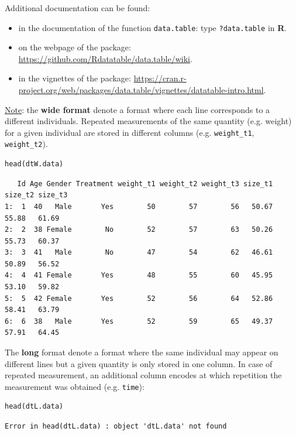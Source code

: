 \documentclass{article}
\newcommand\Rlogo{\textbf{\textsf{R}}\xspace}
\begin{document}
\bigskip

Additional documentation can be found:
\begin{itemize}
\item in the documentation of the function \texttt{data.table}: type \texttt{?data.table} in \Rlogo.
\item on the webpage of the package: \url{https://github.com/Rdatatable/data.table/wiki}.
\item in the vignettes of the package: \url{https://cran.r-project.org/web/packages/data.table/vignettes/datatable-intro.html}.
\end{itemize}

\bigskip

\uline{Note}: the \textbf{wide format} denote a format where each line corresponds
to a different individuals. Repeated measurements of the same quantity
(e.g. weight) for a given individual are stored in different columns
(e.g. \texttt{weight\_t1}, \texttt{weight\_t2}).

\lstset{language=r,label= ,caption= ,captionpos=b,numbers=none}
\begin{lstlisting}
head(dtW.data)
\end{lstlisting}

\begin{verbatim}
   Id Age Gender Treatment weight_t1 weight_t2 weight_t3 size_t1 size_t2 size_t3
1:  1  40   Male       Yes        50        57        56   50.67   55.88   61.69
2:  2  38 Female        No        52        57        63   50.26   55.73   60.37
3:  3  41   Male        No        47        54        62   46.61   50.89   56.52
4:  4  41 Female       Yes        48        55        60   45.95   53.10   59.82
5:  5  42 Female       Yes        52        56        64   52.86   58.41   63.79
6:  6  38   Male       Yes        52        59        65   49.37   57.91   64.45
\end{verbatim}

 The \textbf{long} format denote a format where the same individual may
appear on different lines but a given quantity is only stored in one
column. In case of repeated measurement, an additional column encodes
at which repetition the measurement was obtained (e.g. \texttt{time}):
\lstset{language=r,label= ,caption= ,captionpos=b,numbers=none}
\begin{lstlisting}
head(dtL.data)
\end{lstlisting}

\begin{verbatim}
Error in head(dtL.data) : object 'dtL.data' not found
\end{verbatim}
\end{document}
